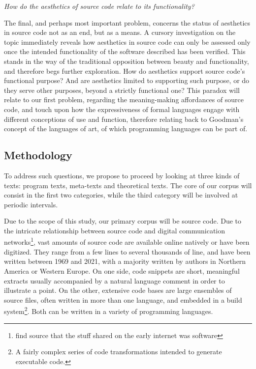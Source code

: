 \vspace*{1\baselineskip}

\emph{How do the aesthetics of source code relate to its functionality?}

The final, and perhaps most important problem, concerns the status of aesthetics in source code not as an end, but as a means. A cursory investigation on the topic immediately reveals how aesthetics in source code can only be assessed only once the intended functionality of the software described has been verified. This stands in the way of the traditional opposition between beauty and functionality, and therefore begs further exploration. How do aesthetics support source code's functional purpose? And are aesthetics limited to supporting such purpose, or do they serve other purposes, beyond a strictly functional one? This paradox will relate to our first problem, regarding the meaning-making affordances of source code, and touch upon how the expressiveness of formal languages engage with different conceptions of use and function, therefore relating back to Goodman's concept of the languages of art, of which programming languages can be part of.

\subsection{Methodology}

To address such questions, we propose to proceed by looking at three kinds of texts: program texts, meta-texts and theoretical texts. The core of our corpus will consist in the first two categories, while the third category will be involved at periodic intervals.

Due to the scope of this study, our primary corpus will be source code. Due to the intricate relationship between source code and digital communication networks\footnote{find source that the stuff shared on the early internet was software}, vast amounts of source code are available online natively or have been digitized. They range from a few lines to several thousands of line, and have been written between 1969 and 2021, with a majority written by authors in Northern America or Western Europe. On one side, code snippets are short, meaningful extracts usually accompanied by a natural language comment in order to illustrate a point. On the other, extensive code bases are large ensembles of source files, often written in more than one language, and embedded in a build system\footnote{A fairly complex series of code transformations intended to generate executable code.}. Both can be written in a variety of programming languages.

